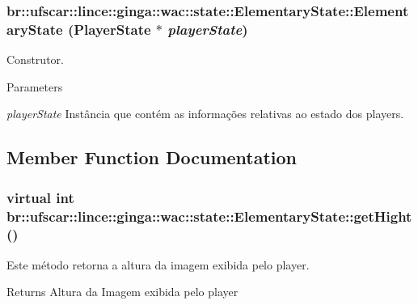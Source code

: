 \hypertarget{classbr_1_1ufscar_1_1lince_1_1ginga_1_1wac_1_1state_1_1ElementaryState_ad47a64749c66f7257d36911ade24ea77}{
\subsubsection[{ElementaryState}]{\setlength{\rightskip}{0pt plus 5cm}br::ufscar::lince::ginga::wac::state::ElementaryState::ElementaryState (PlayerState $\ast$ {\em playerState})}}
\label{classbr_1_1ufscar_1_1lince_1_1ginga_1_1wac_1_1state_1_1ElementaryState_ad47a64749c66f7257d36911ade24ea77}


Construtor. 


\begin{DoxyParams}{Parameters}
\item[{\em playerState}]Instância que contém as informações relativas ao estado dos players. \end{DoxyParams}


\subsection{Member Function Documentation}
\hypertarget{classbr_1_1ufscar_1_1lince_1_1ginga_1_1wac_1_1state_1_1ElementaryState_afe5f10172203bf1bc6064166658de738}{
\subsubsection[{getHight}]{\setlength{\rightskip}{0pt plus 5cm}virtual int br::ufscar::lince::ginga::wac::state::ElementaryState::getHight ()}}
\label{classbr_1_1ufscar_1_1lince_1_1ginga_1_1wac_1_1state_1_1ElementaryState_afe5f10172203bf1bc6064166658de738}


Este método retorna a altura da imagem exibida pelo player. 

\begin{DoxyReturn}{Returns}
Altura da Imagem exibida pelo player 
\end{DoxyReturn}


